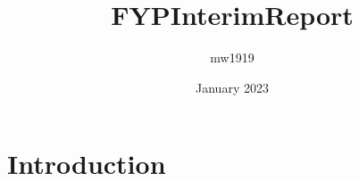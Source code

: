 \documentclass{article}
\title{FYPInterimReport}
\author{mw1919 }
\date{January 2023}
\begin{document}
\maketitle

\section{Introduction}
\end{document}
